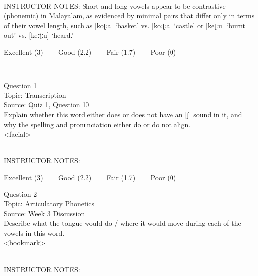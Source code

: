 \documentclass[12pt]{article}
\begin{document}
~\\
INSTRUCTOR NOTES: Short and long vowels appear to be contrastive (phonemic) in Malayalam, as evidenced by minimal pairs that differ only in terms of their vowel length, such as [koʈːa] ‘basket’ vs. [koːʈːa] ‘castle’ or [keʈːu] ‘burnt out’ vs. [keːʈːu] ‘heard.’


\vfill
Excellent (3) ~~~ Good (2.2) ~~~ Fair (1.7) ~~~ Poor (0)
\newpage

\begin{center}
\textbf{{\color{red}{\HUGE END OF EXAM}}}\\

\end{center}
\newpage

\begin{center}
\textbf{{\color{blue}{\HUGE START OF EXAM\\}}}

\textbf{{\color{blue}{\HUGE Student ID: 83841\\}}}

\textbf{{\color{blue}{\HUGE \\}}}

\end{center}
\newpage

{\large Question 1}\\

Topic: Transcription\\
Source: Quiz 1, Question 10\\

Explain whether this word either does or does not have an [ʃ] sound in it, and why the spelling and pronunciation either do or do not align.\\

<facial>


~\\
INSTRUCTOR NOTES: 


\vfill
Excellent (3) ~~~ Good (2.2) ~~~ Fair (1.7) ~~~ Poor (0)
\newpage

{\large Question 2}\\

Topic: Articulatory Phonetics\\
Source: Week 3 Discussion\\

Describe what the tongue would do / where it would move during each of the vowels in this word.\\

<bookmark>


~\\
INSTRUCTOR NOTES: 
\end{document}
